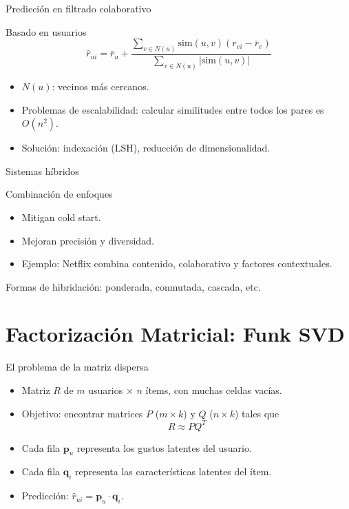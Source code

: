 \documentclass[aspectratio=169, 10pt, xcolor=table]{beamer}
\begin{document}
\begin{frame}{Predicción en filtrado colaborativo}
    \begin{block}{Basado en usuarios}
        \[
        \hat{r}_{ui} = \bar{r}_u + \frac{\sum_{v \in N(u)} \text{sim}(u,v)(r_{vi} - \bar{r}_v)}{\sum_{v \in N(u)} |\text{sim}(u,v)|}
        \]
    \end{block}
    \begin{itemize}
        \item $N(u)$: vecinos más cercanos.
        \item Problemas de escalabilidad: calcular similitudes entre todos los pares es $O(n^2)$.
        \item Solución: indexación (LSH), reducción de dimensionalidad.
    \end{itemize}
\end{frame}

\begin{frame}{Sistemas híbridos}
    \begin{block}{Combinación de enfoques}
        \begin{itemize}
            \item Mitigan cold start.
            \item Mejoran precisión y diversidad.
            \item Ejemplo: Netflix combina contenido, colaborativo y factores contextuales.
        \end{itemize}
    \end{block}
    Formas de hibridación: ponderada, conmutada, cascada, etc.
\end{frame}

\section{Factorización Matricial: Funk SVD}

\begin{frame}{El problema de la matriz dispersa}
    \begin{itemize}
        \item Matriz $R$ de $m$ usuarios $\times$ $n$ ítems, con muchas celdas vacías.
        \item Objetivo: encontrar matrices $P$ ($m \times k$) y $Q$ ($n \times k$) tales que
        \[
        R \approx P Q^T
        \]
        \item Cada fila $\mathbf{p}_u$ representa los gustos latentes del usuario.
        \item Cada fila $\mathbf{q}_i$ representa las características latentes del ítem.
        \item Predicción: $\hat{r}_{ui} = \mathbf{p}_u \cdot \mathbf{q}_i$.
    \end{itemize}
\end{frame}
\end{document}
